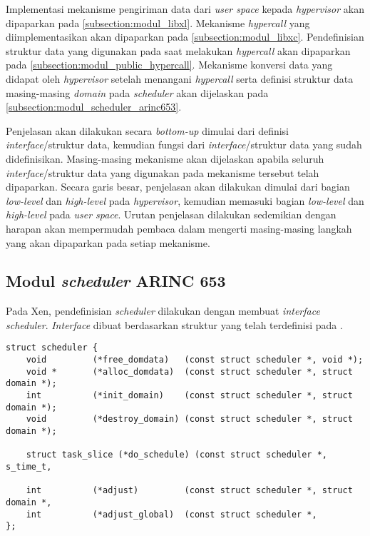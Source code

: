 Implementasi mekanisme pengiriman data dari \textit{user space} kepada \textit{hypervisor} akan dipaparkan pada \autoref{subsection:modul_libxl}. Mekanisme \textit{hypercall} yang diimplementasikan akan dipaparkan pada \autoref{subsection:modul_libxc}. Pendefinisian struktur data yang digunakan pada saat melakukan \textit{hypercall} akan dipaparkan pada \autoref{subsection:modul_public_hypercall}. Mekanisme konversi data yang didapat oleh \textit{hypervisor} setelah menangani \textit{hypercall} serta definisi struktur data masing-masing \textit{domain} pada \textit{scheduler} akan dijelaskan pada \autoref{subsection:modul_scheduler_arinc653}.

Penjelasan akan dilakukan secara \textit{bottom-up} dimulai dari definisi \textit{interface}/struktur data, kemudian fungsi dari \textit{interface}/struktur data yang sudah didefinisikan. Masing-masing mekanisme akan dijelaskan apabila seluruh \textit{interface}/struktur data yang digunakan pada mekanisme tersebut telah dipaparkan. Secara garis besar, penjelasan akan dilakukan dimulai dari bagian \textit{low-level} dan \textit{high-level} pada \textit{hypervisor}, kemudian memasuki bagian \textit{low-level} dan \textit{high-level} pada \textit{user space}. Urutan penjelasan dilakukan sedemikian dengan harapan akan mempermudah pembaca dalam mengerti masing-masing langkah yang akan dipaparkan pada setiap mekanisme.

\subsection{Modul \textit{scheduler} ARINC 653}
\label{subsection:modul_scheduler_arinc653}

Pada Xen, pendefinisian \textit{scheduler} dilakukan dengan membuat \textit{interface} \textit{scheduler}.
\textit{Interface} dibuat berdasarkan struktur yang telah terdefinisi pada .

\begin{lstlisting}[caption={\textit{Interface} dari fungsi \textit{scheduler} yang dimodifikasi/diimplementasi}]
struct scheduler {
    void         (*free_domdata)   (const struct scheduler *, void *);
    void *       (*alloc_domdata)  (const struct scheduler *, struct domain *);
    int          (*init_domain)    (const struct scheduler *, struct domain *);
    void         (*destroy_domain) (const struct scheduler *, struct domain *);

    struct task_slice (*do_schedule) (const struct scheduler *, s_time_t,

    int          (*adjust)         (const struct scheduler *, struct domain *,
    int          (*adjust_global)  (const struct scheduler *,
};
\end{lstlisting}

